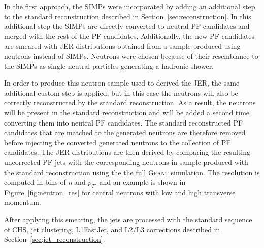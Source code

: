 In the first approach, the \acp{SIMP} were incorporated by adding an additional step to the standard reconstruction described in Section~\ref{sec:reconstruction}. In this additional step the \acp{SIMP} are directly converted to neutral \ac{PF} candidates and merged with the rest of the \ac{PF} candidates. Additionally, the new \ac{PF} candidates are smeared with \ac{JER} distributions obtained from a sample produced using neutrons instead of \acp{SIMP}. Neutrons were chosen because of their resemblance to the \acp{SIMP} as single neutral particles generating a hadronic shower. 

In order to produce this neutron sample used to derived the \ac{JER}, the same additional custom step is applied, but in this case the neutrons will also be correctly reconstructed by the standard reconstruction. As a result, the neutrons will be present in the standard reconstruction and will be added a second time converting them into neutral \ac{PF} candidates. The standard reconstructed \ac{PF} candidates that are matched to the generated neutrons are therefore removed before injecting the converted generated neutrons to the collection of \ac{PF} candidates. The \ac{JER} distributions are then derived by comparing the resulting uncorrected \ac{PF} jets with the corresponding neutrons in sample produced with the standard reconstruction using the the full \textsc{Geant} simulation. The resolution is computed in bins of $\eta$ and $p_T$, and an example is shown in Figure~\ref{fig:neutron_res} for central neutrons with low and high transverse momentum. 

After applying this smearing, the jets are processed with the standard sequence of \ac{CHS}, jet clustering, L1FastJet, and L2/L3 corrections described in Section~\ref{sec:jet_reconstruction}.




